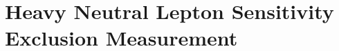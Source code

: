 \chapter{Heavy Neutral Lepton Sensitivity Exclusion Measurement}

\ifpdf
    \graphicspath{{Chapter7/Figs/Raster/}{Chapter7/Figs/PDF/}{Chapter7/Figs/}}
\else
    \graphicspath{{Chapter7/Figs/Vector/}{Chapter7/Figs/}}
\fi

